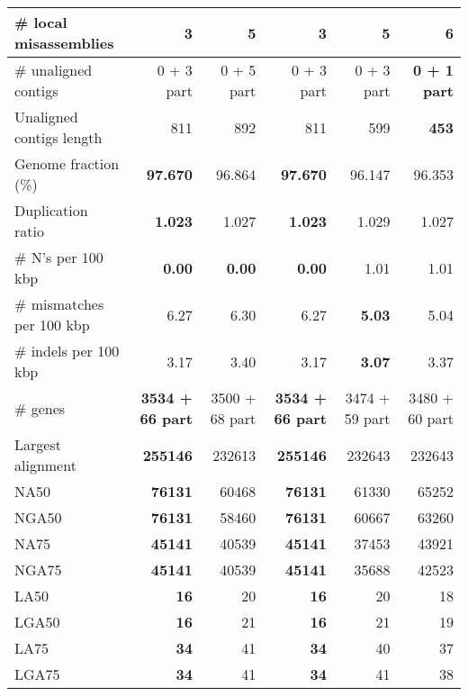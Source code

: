 \documentclass[12pt,a4paper]{article}
\begin{document}
\begin{table}[ht]
\begin{center}
\begin{tabular}{|l*{5}{|r}|}
\# local misassemblies & {\bf 3} & 5 & {\bf 3} & 5 & 6 \\ \hline
\# unaligned contigs & 0 + 3 part & 0 + 5 part & 0 + 3 part & 0 + 3 part & {\bf 0 + 1 part} \\ \hline
Unaligned contigs length & 811 & 892 & 811 & 599 & {\bf 453} \\ \hline
Genome fraction (\%) & {\bf 97.670} & 96.864 & {\bf 97.670} & 96.147 & 96.353 \\ \hline
Duplication ratio & {\bf 1.023} & 1.027 & {\bf 1.023} & 1.029 & 1.027 \\ \hline
\# N's per 100 kbp & {\bf 0.00} & {\bf 0.00} & {\bf 0.00} & 1.01 & 1.01 \\ \hline
\# mismatches per 100 kbp & 6.27 & 6.30 & 6.27 & {\bf 5.03} & 5.04 \\ \hline
\# indels per 100 kbp & 3.17 & 3.40 & 3.17 & {\bf 3.07} & 3.37 \\ \hline
\# genes & {\bf 3534 + 66 part} & 3500 + 68 part & {\bf 3534 + 66 part} & 3474 + 59 part & 3480 + 60 part \\ \hline
Largest alignment & {\bf 255146} & 232613 & {\bf 255146} & 232643 & 232643 \\ \hline
NA50 & {\bf 76131} & 60468 & {\bf 76131} & 61330 & 65252 \\ \hline
NGA50 & {\bf 76131} & 58460 & {\bf 76131} & 60667 & 63260 \\ \hline
NA75 & {\bf 45141} & 40539 & {\bf 45141} & 37453 & 43921 \\ \hline
NGA75 & {\bf 45141} & 40539 & {\bf 45141} & 35688 & 42523 \\ \hline
LA50 & {\bf 16} & 20 & {\bf 16} & 20 & 18 \\ \hline
LGA50 & {\bf 16} & 21 & {\bf 16} & 21 & 19 \\ \hline
LA75 & {\bf 34} & 41 & {\bf 34} & 40 & 37 \\ \hline
LGA75 & {\bf 34} & 41 & {\bf 34} & 41 & 38 \\ \hline
\end{tabular}
\end{center}
\end{table}
\end{document}
